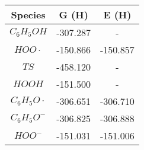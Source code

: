 \begin{tabular}{|c|c|c|}
       \hline
       Species                  & G (H)          & E (H)           \\ \hline
       $C_6H_5OH$                   & -307.287 & -            \\ \hline
       $HOO\cdot$                      & -150.866 & -150.857 \\ \hline
       $TS$                       & -458.120 & -            \\ \hline
       $HOOH$                     & -151.500 & -            \\ \hline
       $C_6H_5O\cdot$                    & -306.651 & -306.710 \\ \hline
       $C_6H_5O^-$ & -306.825 & -306.888 \\ \hline
       $HOO^-$   & -151.031 & -151.006  \\ \hline
\end{tabular}
